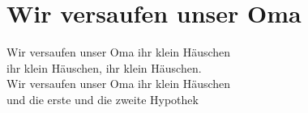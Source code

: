 \section{Wir versaufen unser Oma}
Wir versaufen unser Oma ihr klein Häuschen\\
ihr klein Häuschen, ihr klein Häuschen.\\
Wir versaufen unser Oma ihr klein Häuschen\\
und die erste und die zweite Hypothek

